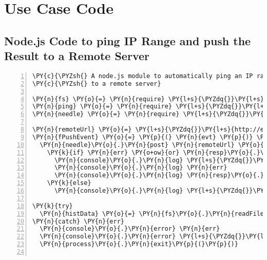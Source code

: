 
\chapter{Use Case Code}


\section{Node.js Code to ping IP Range and push the Result to a Remote Server\label{eventproducer}}

\begin{Verbatim}[fontsize=\scriptsize,commandchars=\\\{\},numbers=left,firstnumber=1,stepnumber=1]
\PY{c}{\PYZsh{} A node.js module to automatically ping an IP range and push the response result}
\PY{c}{\PYZsh{} to a remote server}

\PY{n}{fs} \PY{o}{=} \PY{n}{require} \PY{l+s}{\PYZdq{}}\PY{l+s}{fs}\PY{l+s}{\PYZdq{}}
\PY{n}{ping} \PY{o}{=} \PY{n}{require} \PY{l+s}{\PYZdq{}}\PY{l+s}{net\PYZhy{}ping}\PY{l+s}{\PYZdq{}}
\PY{n}{needle} \PY{o}{=} \PY{n}{require} \PY{l+s}{\PYZdq{}}\PY{l+s}{needle}\PY{l+s}{\PYZdq{}}
    
\PY{n}{remoteUrl} \PY{o}{=} \PY{l+s}{\PYZdq{}}\PY{l+s}{http://ec2\PYZhy{}54\PYZhy{}196\PYZhy{}2\PYZhy{}15.compute\PYZhy{}1.amazonaws.com}\PY{l+s}{\PYZdq{}}
\PY{n}{fPushEvent} \PY{o}{=} \PY{p}{(} \PY{n}{evt} \PY{p}{)} \PY{o}{\PYZhy{}}\PY{o}{\PYZgt{}}
  \PY{n}{needle}\PY{o}{.}\PY{n}{post} \PY{n}{remoteUrl} \PY{o}{+} \PY{l+s}{\PYZdq{}}\PY{l+s}{/measurements}\PY{l+s}{\PYZdq{}}\PY{p}{,} \PY{n}{JSON}\PY{o}{.}\PY{n}{stringify}\PY{p}{(} \PY{n}{evt} \PY{p}{)}\PY{p}{,} \PY{p}{(} \PY{n}{err}\PY{p}{,} \PY{n}{resp}\PY{p}{,} \PY{n}{body} \PY{p}{)} \PY{o}{\PYZhy{}}\PY{o}{\PYZgt{}}
    \PY{k}{if} \PY{n}{err} \PY{o+ow}{or} \PY{n}{resp}\PY{o}{.}\PY{n}{statusCode} \PY{n}{isnt} \PY{l+m+mi}{200}
      \PY{n}{console}\PY{o}{.}\PY{n}{log} \PY{l+s}{\PYZdq{}}\PY{l+s}{Error in pushing event!}\PY{l+s}{\PYZdq{}}
      \PY{n}{console}\PY{o}{.}\PY{n}{log} \PY{n}{err}
      \PY{n}{console}\PY{o}{.}\PY{n}{log} \PY{n}{resp}\PY{o}{.}\PY{n}{statusCode}
    \PY{k}{else}
      \PY{n}{console}\PY{o}{.}\PY{n}{log} \PY{l+s}{\PYZdq{}}\PY{l+s}{Successfully posted an event}\PY{l+s}{\PYZdq{}}

\PY{k}{try}
  \PY{n}{histData} \PY{o}{=} \PY{n}{fs}\PY{o}{.}\PY{n}{readFileSync} \PY{l+s}{\PYZdq{}}\PY{l+s}{histoappend.json}\PY{l+s}{\PYZdq{}}\PY{p}{,} \PY{l+s}{\PYZdq{}}\PY{l+s}{utf8}\PY{l+s}{\PYZdq{}}
\PY{n}{catch} \PY{n}{err}
  \PY{n}{console}\PY{o}{.}\PY{n}{error} \PY{n}{err}
  \PY{n}{console}\PY{o}{.}\PY{n}{error} \PY{l+s}{\PYZdq{}}\PY{l+s}{Error reading historical data file}\PY{l+s}{\PYZdq{}}
  \PY{n}{process}\PY{o}{.}\PY{n}{exit}\PY{p}{(}\PY{p}{)}


\end{Verbatim}
